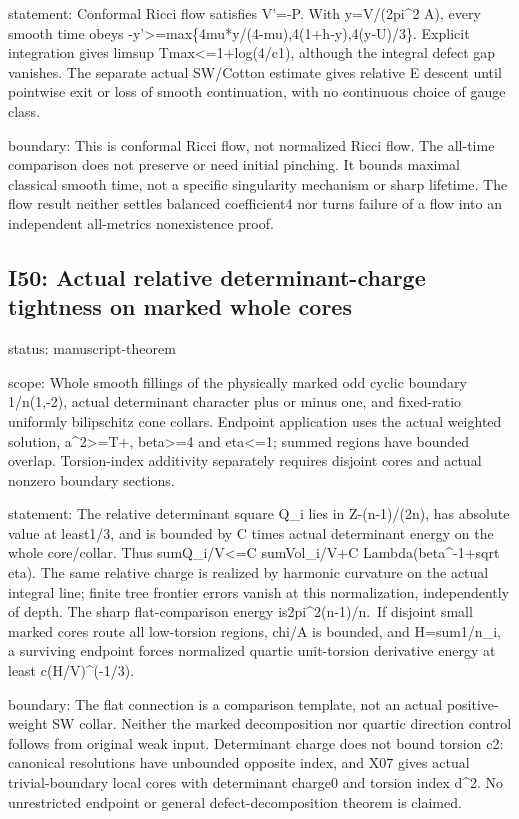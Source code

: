 \documentclass[
  10pt,
]{article}
\begin{document}
statement: Conformal Ricci flow satisfies V'=-P. With y=V/(2pi\^{}2 A),
every smooth time obeys
-y'\textgreater=max\{4mu*y/(4-mu),4(1+h-y),4(y-U)/3\}. Explicit
integration gives limsup Tmax\textless=1+log(4/c1), although the
integral defect gap vanishes. The separate actual SW/Cotton estimate
gives relative E descent until pointwise exit or loss of smooth
continuation, with no continuous choice of gauge class.

boundary: This is conformal Ricci flow, not normalized Ricci flow. The
all-time comparison does not preserve or need initial pinching. It
bounds maximal classical smooth time, not a specific singularity
mechanism or sharp lifetime. The flow result neither settles balanced
coefficient4 nor turns failure of a flow into an independent all-metrics
nonexistence proof.

\hypertarget{i50-actual-relative-determinant-charge-tightness-on-marked-whole-cores}{%
\subsection{I50: Actual relative determinant-charge tightness on marked
whole
cores}\label{i50-actual-relative-determinant-charge-tightness-on-marked-whole-cores}}

status: manuscript-theorem

scope: Whole smooth fillings of the physically marked odd cyclic
boundary 1/n(1,-2), actual determinant character plus or minus one, and
fixed-ratio uniformly bilipschitz cone collars. Endpoint application
uses the actual weighted solution, a\^{}2\textgreater=T+,
beta\textgreater=4 and eta\textless=1; summed regions have bounded
overlap. Torsion-index additivity separately requires disjoint cores and
actual nonzero boundary sections.

statement: The relative determinant square Q\_i lies in Z-(n-1)/(2n),
has absolute value at least1/3, and is bounded by C times actual
determinant energy on the whole core/collar. Thus
sum\textbar Q\_i\textbar/V\textless=C sumVol\_i/V+C
Lambda(beta\^{}-1+sqrt eta). The same relative charge is realized by
harmonic curvature on the actual integral line; finite tree frontier
errors vanish at this normalization, independently of depth. The sharp
flat-comparison energy is2pi\^{}2(n-1)/n.~If disjoint small marked cores
route all low-torsion regions, chi/A is bounded, and H=sum1/n\_i, a
surviving endpoint forces normalized quartic unit-torsion derivative
energy at least c(H/V)\^{}(-1/3).

boundary: The flat connection is a comparison template, not an actual
positive-weight SW collar. Neither the marked decomposition nor quartic
direction control follows from original weak input. Determinant charge
does not bound torsion c2: canonical resolutions have unbounded opposite
index, and X07 gives actual trivial-boundary local cores with
determinant charge0 and torsion index d\^{}2. No unrestricted endpoint
or general defect-decomposition theorem is claimed.
\end{document}
